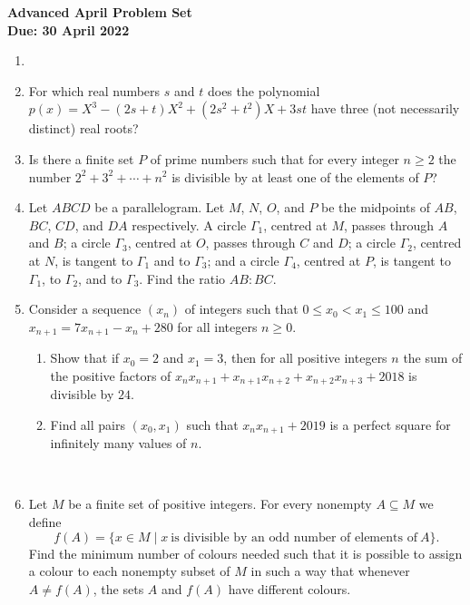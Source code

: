 \documentclass{article}
\begin{document}
\thispagestyle{empty}

\begin{center}
  \textbf{\Large Advanced April Problem Set}
  \\ \vspace{1em}
  \textbf{\large Due: 30 April 2022}
\end{center}

\bigskip

\begin{enumerate}[itemsep=\fill]

\item %


\item %
For which real numbers $s$ and $t$ does the polynomial $p(x) = X^3 -(2s+t)X^2 +(2s^2+t^2)X +3st$ have three (not necessarily distinct) real roots?


\item %
Is there a finite set $P$ of prime numbers such that for every integer $n \geq 2$ the number $2^2 +3^2 +\dotsb +n^2$ is divisible by at least one of the elements of $P$?


\item %
Let $ABCD$ be a parallelogram.
Let $M$, $N$, $O$, and $P$ be the midpoints of $AB$, $BC$, $CD$, and $DA$ respectively.
A circle $\Gamma_1$, centred at $M$, passes through $A$ and $B$; a circle $\Gamma_3$, centred at $O$, passes through $C$ and $D$; a circle $\Gamma_2$, centred at $N$, is tangent to $\Gamma_1$ and to $\Gamma_3$; and a circle $\Gamma_4$, centred at $P$, is tangent to $\Gamma_1$, to $\Gamma_2$, and to $\Gamma_3$.
Find the ratio $AB:BC$.


\item %
Consider a sequence $(x_n)$ of integers such that $0 \leq x_0 < x_1 \leq 100$ and $x_{n+1} = 7x_{n+1} -x_n +280$ for all integers $n \geq 0$.
\begin{enumerate}
	\item Show that if $x_0 = 2$ and $x_1 = 3$, then for all positive integers $n$ the sum of the positive factors of $x_n x_{n+1} +x_{n+1}x_{n+2} +x_{n+2}x_{n+3} +2018$ is divisible by $24$.
	\item Find all pairs $(x_0,x_1)$ such that $x_n x_{n+1} +2019$ is a perfect square for infinitely many values of $n$.
\end{enumerate}~


\item %
Let $M$ be a finite set of positive integers.
For every nonempty $A \subseteq M$ we define
\[ f(A) = \{x \in M \mid x \ \text{is divisible by an odd number of elements of} \ A\}. \]
Find the minimum number of colours needed such that it is possible to assign a colour to each nonempty subset of $M$ in such a way that whenever $A \neq f(A)$, the sets $A$ and $f(A)$ have different colours.

\end{enumerate}
\end{document}
